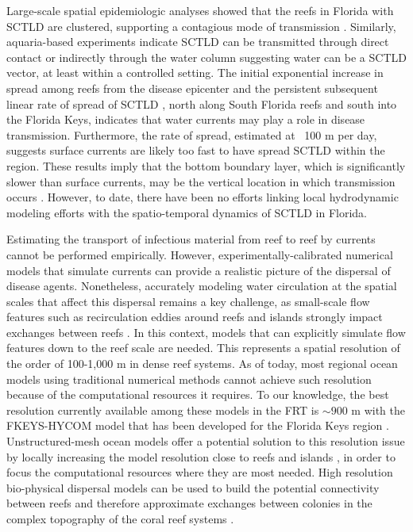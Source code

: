 \documentclass[utf8]{frontiersSCNS}
\begin{document}
Large-scale spatial epidemiologic analyses showed that the reefs in Florida with SCTLD are clustered, supporting a contagious mode of transmission \citep{muller2020spatial}. Similarly, aquaria-based experiments indicate SCTLD can be transmitted through direct contact or indirectly through the water column \citep{aeby2019pathogenesis} suggesting water can be a SCTLD vector, at least within a controlled setting. The initial exponential increase in spread among reefs from the disease epicenter \citep{precht2016unprecedented} and the persistent subsequent linear rate of spread of SCTLD \citep{muller2020spatial}, north along South Florida reefs and south into the Florida Keys, indicates that water currents may play a role in disease transmission. Furthermore, the rate of spread, estimated at ~100 m per day, suggests surface currents are likely too fast to have spread SCTLD within the region. These results imply that the bottom boundary layer, which is significantly slower than surface currents, may be the vertical location in which transmission occurs \citep{aeby2019pathogenesis}. However, to date, there have been no efforts linking local hydrodynamic modeling efforts with the spatio-temporal dynamics of SCTLD in Florida.

Estimating the transport of infectious material from reef to reef by currents cannot be performed empirically. However, experimentally-calibrated numerical models that simulate currents can provide a realistic picture of the dispersal of disease agents. Nonetheless, accurately modeling water circulation at the spatial scales that affect this dispersal remains a key challenge, as small-scale flow features such as recirculation eddies around reefs and islands strongly impact exchanges between reefs \citep{wolanski1994physical, burgess2007influence, figueiredo2013synthesizing}. In this context, models that can explicitly simulate flow features down to the reef scale are needed. This represents a spatial resolution of the order of 100-1,000 m in dense reef systems. As of today, most regional ocean models using traditional numerical methods cannot achieve such resolution because of the computational resources it requires. To our knowledge, the best resolution currently available among these models in the FRT is $\sim900$ m with the FKEYS-HYCOM model that has been developed for the Florida Keys region \citep{kourafalou2012florida, sponaugle2012observed, vaz2016perfect}. Unstructured-mesh ocean models offer a potential solution to this resolution issue by locally increasing the model resolution close to reefs and islands \citep{lambrechts2008multi, thomas2014numerical, thomas2015connectivity}, in order to focus the computational resources where they are most needed. High resolution bio-physical dispersal models can be used to build the potential connectivity between reefs and therefore approximate exchanges between colonies in the complex topography of the coral reef systems \citep{frys20}.
\end{document}
